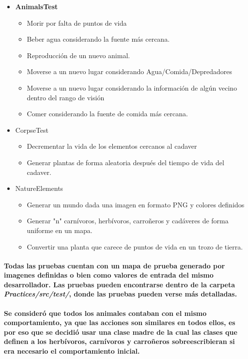       \begin{itemize}
        \item{\textbf{AnimalsTest}}
          \begin{itemize}
            \item{Morir por falta de puntos de vida}
            \item{Beber agua considerando la fuente más cercana.}
            \item{Reproducción de un nuevo animal.}
            \item{Moverse a un nuevo lugar considerando Agua/Comida/Depredadores}
            \item{Moverse a un nuevo lugar considerando la información de algún vecino dentro del rango de visión}
            \item{Comer considerando la fuente de comida más cercana.}
          \end{itemize}
        \item{CorpseTest}
          \begin{itemize}
            \item{Decrementar la vida de los elementos cercanos al cadaver}            
            \item{Generar plantas de forma aleatoria después del tiempo de vida del cadaver.}
          \end{itemize}
        \item{NatureElements}
          \begin{itemize}
            \item{Generar un mundo dada una imagen en formato PNG y colores definidos}
            \item{Generar "n" carnívoros, herbívoros, carroñeros y cadáveres de forma uniforme en un mapa.}
            \item{Convertir una planta que carece de puntos de vida en un trozo de tierra.}
          \end{itemize}
      \end{itemize}      
    \paragraph{Todas las pruebas cuentan con un mapa de prueba generado por imagenes definidas o bien como valores de entrada del mismo desarrollador. Las pruebas pueden encontrarse dentro de la carpeta \textit{Practices/src/test/}, donde las pruebas pueden verse más detalladas.}
    \paragraph{Se consideró que todos los animales contaban con el mismo comportamiento, ya que las acciones son similares en todos ellos, es por eso que se decidió usar una clase madre de la cual las clases que definen a los herbívoros, carnívoros y carroñeros sobreescribieran si era necesario el comportamiento inicial. }
